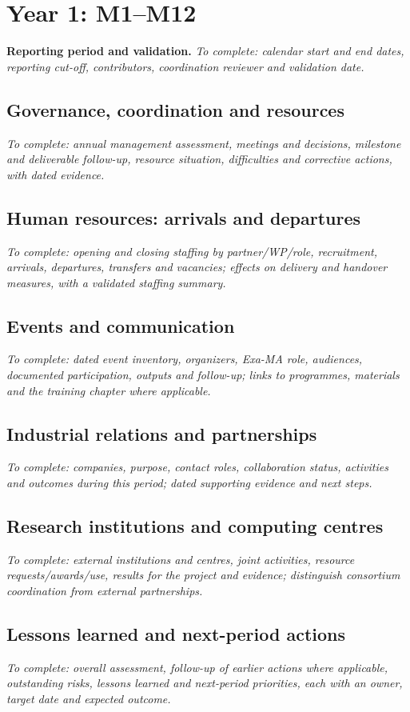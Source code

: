 \clearpage
\section{Year 1: M1--M12}
\label{sec:management-year-1}

\textbf{Reporting period and validation.}
\emph{To complete: calendar start and end dates, reporting cut-off, contributors,
coordination reviewer and validation date.}

\subsection{Governance, coordination and resources}
\emph{To complete: annual management assessment, meetings and decisions,
milestone and deliverable follow-up, resource situation, difficulties and
corrective actions, with dated evidence.}

\subsection{Human resources: arrivals and departures}
\emph{To complete: opening and closing staffing by partner/WP/role, recruitment,
arrivals, departures, transfers and vacancies; effects on delivery and handover
measures, with a validated staffing summary.}

\subsection{Events and communication}
\emph{To complete: dated event inventory, organizers, Exa-MA role, audiences,
documented participation, outputs and follow-up; links to programmes, materials
and the training chapter where applicable.}

\subsection{Industrial relations and partnerships}
\emph{To complete: companies, purpose, contact roles, collaboration status,
activities and outcomes during this period; dated supporting evidence and
next steps.}

\subsection{Research institutions and computing centres}
\emph{To complete: external institutions and centres, joint activities,
resource requests/awards/use, results for the project and evidence;
distinguish consortium coordination from external partnerships.}

\subsection{Lessons learned and next-period actions}
\emph{To complete: overall assessment, follow-up of earlier actions where
applicable, outstanding risks, lessons learned and next-period priorities,
each with an owner, target date and expected outcome.}
